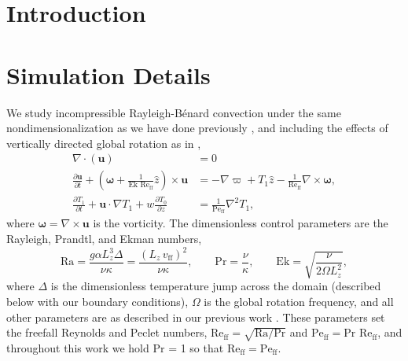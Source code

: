 \documentclass[aps, pre, onecolumn, nofootinbib, notitlepage, groupedaddress, amsfonts, amssymb, amsmath, longbibliography]{revtex4-1}
\newcommand{\Div}[1]{\ensuremath{\nabla\cdot\left( #1\right)}}
\newcommand{\grad}{\ensuremath{\nabla}}
\newcommand{\RB}{Rayleigh-B\'{e}nard }
\newcommand{\Reff}{\ensuremath{\text{Re}_{\text{ff}}}}
\newcommand{\Peff}{\ensuremath{\text{Pe}_{\text{ff}}}}
\begin{document}
\section{Introduction}


\section{Simulation Details}
\label{sec:simulations}
We study incompressible \RB convection under the same nondimensionalization as we have done previously \cite{anders&all2018}, and including the effects of vertically directed global rotation as in \cite{julien&all1996},
\begin{align}
\Div{\bm{u}} &= 0
	\label{eqn:incompressible}
\\
\frac{\partial \bm{u}}{\partial t} + \left(\bm{\omega} + \frac{1}{\text{Ek }\Reff}\hat{z}\right)\times\bm{u} 
&= - \grad \varpi + T_1\hat{z} - \frac{1}{\Reff}\grad\times\bm{\omega},
	\label{eqn:bouss_momentum}
\\
\frac{\partial T_1}{\partial t}  + \bm{u}\cdot\grad T_1 + w \frac{\partial T_0}{\partial z} 
&= \frac{1}{\Peff}\grad^2 T_1,
	\label{eqn:bouss_energy}
\end{align}
where $\bm{\omega} = \grad \times \bm{u}$ is the vorticity.
The dimensionless control parameters are the Rayleigh, Prandtl, and Ekman numbers,
\begin{equation}
\text{Ra} = \frac{g \alpha L_z^3 \Delta}{\nu\kappa} = \frac{(L_z\,v_{\text{ff}})^2}{\nu\kappa}, \qquad \text{Pr} = \frac{\nu}{\kappa}, \qquad \text{Ek} = \sqrt{\frac{\nu}{2\Omega L_z^2}},
\end{equation}
where $\Delta$ is the dimensionless temperature jump across the domain (described below with our boundary conditions), $\Omega$ is the global rotation frequency, and all other parameters are as described in our previous work \cite{anders&all2018}.
These parameters set the freefall Reynolds and Peclet numbers, $\Reff = \sqrt{\text{Ra}/\text{Pr}}$ and $\Peff = \text{Pr }\Reff$, and throughout this work we hold Pr = 1 so that $\Reff = \Peff$.
\end{document}
